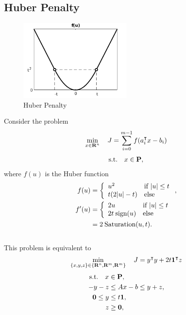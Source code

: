 \documentclass{article}
\begin{document}
    \clearpage

\subsection{Huber Penalty}

    \begin{figure}[h!]
        \centering
        \includegraphics[width=0.5\textwidth]{./figs/norm/huber.png}
        \caption{Huber Penalty}
        \label{fig:huber}
    \end{figure}
    Consider the problem
    \begin{align*}
        \min_{x\in\textbf{R}^n}\quad J = \sum_{i=0}^{m-1} f(a_i^\intercal x - b_i)
    \end{align*}
    \begin{align*}
        \text{s.t.}\quad x\in\textbf{P},
    \end{align*}
    where $f(u)$ is the Huber function
    \begin{align}
        f(u) &= \left\{\begin{array}{lllllllllllllllllll}u^2 & \text{if $|u|\leq t$} \\ t(2|u|-t) & \text{else}\end{array}\right.,\\
        f'(u) &= \left\{\begin{array}{lllllllllllllllllll}2u & \text{if $|u|\leq t$} \\ 2t\:\text{sign}(u) & \text{else}\end{array}\right.\nonumber\\
        &=2\:\text{Saturation}(u,t).\nonumber
    \end{align}
    \\
    This problem is equivalent to \cite[p.~190]{bv_cvxbook}
    \begin{align*}
        \min_{\{x,y,z\}\in\{\textbf{R}^n,\textbf{R}^m,\textbf{R}^m\}}\quad J = y^\intercal y+2t\textbf{1}^\intercal z
    \end{align*}
    \begin{align*}
        \text{s.t.}\quad x&\in\textbf{P},\\
        -y-z&\leq Ax-b\leq y+z,\\
        \textbf{0}\leq y &\leq t\textbf{1},\\
        z&\geq \textbf{0},
    \end{align*}
\end{document}
